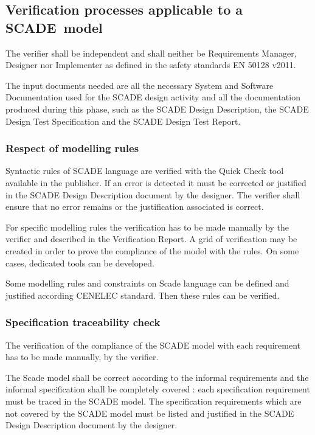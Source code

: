 \subsection{Verification processes applicable to a SCADE~model}

The verifier shall be independent and shall neither be Requirements Manager, Designer nor Implementer as defined in the safety standards EN 50128 v2011.

The input documents needed are all the necessary System and Software Documentation used for the SCADE design activity and all the documentation produced during this phase, such as the SCADE Design Description, the SCADE Design Test Specification and the SCADE Design Test Report.

\subsubsection{Respect of modelling rules}

Syntactic rules of SCADE language are verified with the Quick Check tool available in the publisher. If an error is detected it must be corrected or justified in the SCADE Design Description document by the designer. The verifier shall ensure that no error remains or the justification associated is correct.

For specific modelling rules the verification has to be made manually by the verifier and described in the Verification Report. A grid of verification may be created in order to prove the compliance of the model with the rules. On some cases, dedicated tools can be developed.

Some modelling rules and constraints on Scade language can be defined and justified according CENELEC standard. Then these rules can be verified.

\subsubsection{Specification traceability check}

The verification of the compliance of the SCADE model with each requirement has to be made manually, by the verifier. 

The Scade model shall be correct according to the informal requirements and the informal specification shall be completely covered : each specification requirement must be traced in the SCADE model. The specification requirements which are not covered by the SCADE model must be listed and justified in the SCADE Design Description document by the designer.

